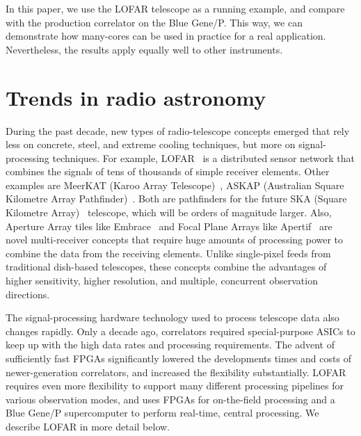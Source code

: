 \documentclass{article}
\begin{document}
In this paper, we use the LOFAR telescope as a running example, and
compare with the production correlator on the Blue Gene/P. This way,
we can demonstrate how many-cores can be used in practice for a real
application. Nevertheless, the results apply equally well to other
instruments.


\section{Trends in radio astronomy}






During the past decade, new types of radio-telescope concepts emerged that
rely less on concrete, steel, and extreme cooling techniques, but more on
signal-processing techniques.
For example, LOFAR~\cite{Butcher:04,deVos:09} is a distributed sensor network
that combines the signals of tens of thousands of simple receiver elements.
Other examples are MeerKAT (Karoo Array Telescope)~\cite{meerkat}, 
ASKAP (Australian Square Kilometre Array Pathfinder)~\cite{askap}. Both are
pathfinders for the future SKA (Square Kilometre Array)~\cite{ska} telescope, which
will be orders of magnitude larger.
Also, Aperture Array tiles like Embrace~\cite{embrace} and Focal Plane Arrays
like Apertif~\cite{apertif} are novel multi-receiver concepts that require huge
amounts of processing power to combine the data from the receiving elements.
Unlike single-pixel feeds from traditional dish-based telescopes, these
concepts combine the advantages of higher sensitivity, higher resolution,
and multiple, concurrent observation directions.

The signal-processing hardware technology used to process telescope
data also changes rapidly.  Only a decade ago, correlators required
special-purpose ASICs to keep up with the high data rates and
processing requirements.  The advent of sufficiently fast FPGAs
significantly lowered the developments times and costs of
newer-generation correlators, and increased the flexibility
substantially. LOFAR requires even more flexibility to support many
different processing pipelines for various observation modes, and uses
FPGAs for on-the-field processing and a Blue Gene/P
supercomputer to perform real-time, central processing.
We describe LOFAR in more detail below.
\end{document}
